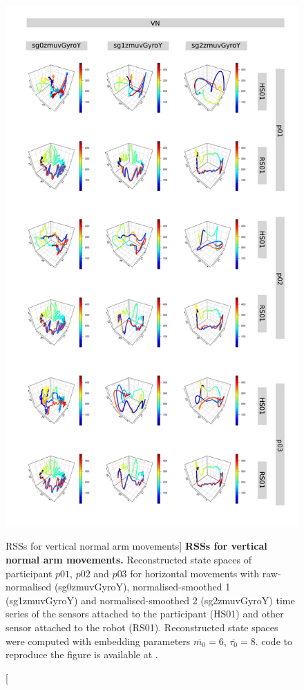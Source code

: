 \begin{figure}
\centering
\includegraphics[height=0.85\textheight]{rss_VN}
\caption
	[RSSs for vertical normal arm movements]{
	{\bf RSSs for vertical normal arm movements.}
	Reconstructed state spaces %
	of participant $p01$, $p02$ and $p03$ for horizontal movements 
	with raw-normalised (sg0zmuvGyroY), 
	normalised-smoothed 1 (sg1zmuvGyroY) and 
	normalised-smoothed 2 (sg2zmuvGyroY) time series of the 
	sensors attached to the participant (HS01) and other sensor 
	attached to the robot (RS01).	
	Reconstructed state spaces were computed with 
	embedding parameters $\overline{m_0}=6$, $\overline{\tau_0}=8$.
	\R code to reproduce the figure is available at 
	.
        }
    \label{fig:rss_VN}
\end{figure}

